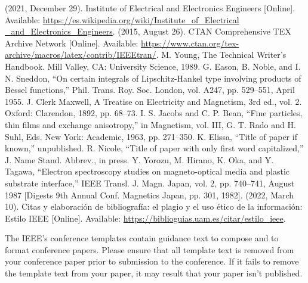 \documentclass[letterpaper, 10pt, conference]{IEEEtran} %
\begin{document}
	\begin{thebibliography}{00}
		 (2021, December 29). Institute of Electrical and Electronics Engineers [Online]. Available: \href{https://es.wikipedia.org/wiki/Institute_of_Electrical_and_Electronics_Engineers}{https://es.wikipedia.org/wiki/Institute\_of\_Electrical \_and\_Electronics\_Engineers}.
		 (2015, August 26). CTAN Comprehensive TEX Archive Network [Online]. Available: \href{https://www.ctan.org/tex-archive/macros/latex/contrib/IEEEtran/}{https://www.ctan.org/tex-archive/macros/latex/contrib/IEEEtran/}.
		 M. Young, The Technical Writer's Handbook. Mill Valley, CA: University Science, 1989.
		 G. Eason, B. Noble, and I. N. Sneddon, ``On certain integrals of Lipschitz-Hankel type involving products of Bessel functions,'' Phil. Trans. Roy. Soc. London, vol. A247, pp. 529--551, April 1955.
		 J. Clerk Maxwell, A Treatise on Electricity and Magnetism, 3rd ed., vol. 2. Oxford: Clarendon, 1892, pp. 68--73.
		 I. S. Jacobs and C. P. Bean, ``Fine particles, thin films and exchange anisotropy,'' in Magnetism, vol. III, G. T. Rado and H. Suhl, Eds. New York: Academic, 1963, pp. 271--350.
		 K. Elissa, ``Title of paper if known,'' unpublished.
		 R. Nicole, ``Title of paper with only first word capitalized,'' J. Name Stand. Abbrev., in press.
		 Y. Yorozu, M. Hirano, K. Oka, and Y. Tagawa, ``Electron spectroscopy studies on magneto-optical media and plastic substrate interface,'' IEEE Transl. J. Magn. Japan, vol. 2, pp. 740--741, August 1987 [Digests 9th Annual Conf. Magnetics Japan, pp. 301, 1982].
		 (2022, March 10). Citas y elaboración de bibliografía: el plagio y el uso ético de la información: Estilo IEEE [Online]. Available: \href{https://biblioguias.uam.es/citar/estilo_ieee}{https://biblioguias.uam.es/citar/estilo\_ieee}.
	\end{thebibliography}
	
	\vspace{12pt}
	\color{red}
	The IEEE's conference templates contain guidance text to compose and to format conference papers. Please ensure that all template text is removed from your conference paper prior to submission to the conference. If it fails to remove the template text from your paper, it may result that your paper isn't published.
\end{document}

